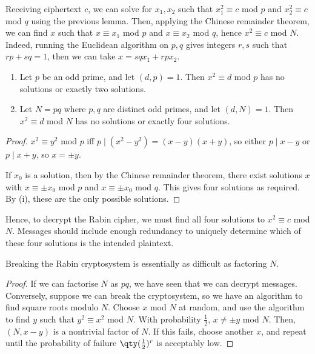 Receiving ciphertext $c$, we can solve for $x_1, x_2$ such that $x_1^2 \equiv c$ mod $p$ and $x_2^2 \equiv c$ mod $q$ using the previous lemma.
Then, applying the Chinese remainder theorem, we can find $x$ such that $x \equiv x_1$ mod $p$ and $x \equiv x_2$ mod $q$, hence $x^2 \equiv c$ mod $N$.
Indeed, running the Euclidean algorithm on $p, q$ gives integers $r, s$ such that $rp + sq = 1$, then we can take $x = sqx_1 + rpx_2$.
\begin{lemma}
    \begin{enumerate}
        \item Let $p$ be an odd prime, and let $(d, p) = 1$.
        Then $x^2 \equiv d$ mod $p$ has no solutions or exactly two solutions.
        \item Let $N = pq$ where $p, q$ are distinct odd primes, and let $(d, N) = 1$.
        Then $x^2 \equiv d$ mod $N$ has no solutions or exactly four solutions.
    \end{enumerate}
\end{lemma}
\begin{proof}
    $x^2 \equiv y^2$ mod $p$ iff $p \mid (x^2 - y^2) = (x-y)(x+y)$, so either $p \mid x-y$ or $p \mid x+y$, so $x = \pm y$.

    If $x_0$ is a solution, then by the Chinese remainder theorem, there exist solutions $x$ with $x \equiv \pm x_0$ mod $p$ and $x \equiv \pm x_0$ mod $q$.
    This gives four solutions as required.
    By (i), these are the only possible solutions.
\end{proof}
Hence, to decrypt the Rabin cipher, we must find all four solutions to $x^2 \equiv c$ mod $N$.
Messages should include enough redundancy to uniquely determine which of these four solutions is the intended plaintext.
\begin{theorem}
    Breaking the Rabin cryptosystem is essentially as difficult as factoring $N$.
\end{theorem}
\begin{proof}
    If we can factorise $N$ as $pq$, we have seen that we can decrypt messages.
    Conversely, suppose we can break the cryptosystem, so we have an algorithm to find square roots modulo $N$.
    Choose $x$ mod $N$ at random, and use the algorithm to find $y$ such that $y^2 \equiv x^2$ mod $N$.
    With probability $\frac{1}{2}$, $x \neq \pm y$ mod $N$.
    Then, $(N, x-y)$ is a nontrivial factor of $N$.
    If this fails, choose another $x$, and repeat until the probability of failure $\qty(\frac{1}{2})^r$ is acceptably low.
\end{proof}

